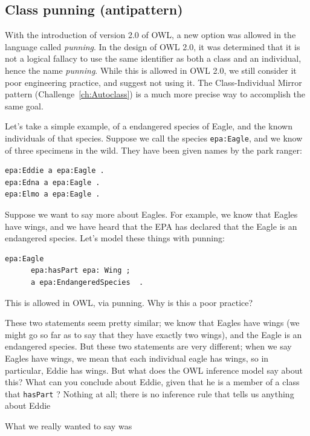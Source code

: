 \subsection{Class punning (antipattern)}

With the introduction of version 2.0 of OWL, a new option was allowed in the 
language called \emph{punning}.  In the design of OWL 2.0, it was determined that 
it is not a logical fallacy to use the same identifier as both a class and 
an individual, hence the name \emph{punning}.  While this is allowed in OWL 2.0, 
we still consider it poor engineering practice, and suggest not using it.  The
Class-Individual Mirror pattern (Challenge~\ref{ch:Autoclass}) is a much more precise way
to accomplish the same goal. 

Let's take a simple example, of a endangered species of Eagle, and the known 
individuals of that species.  Suppose we call the species \texttt{epa:Eagle}, and 
we know of three specimens in the wild.  They have been given names by the 
park ranger:

\begin{lstlisting}
epa:Eddie a epa:Eagle .
epa:Edna a epa:Eagle .
epa:Elmo a epa:Eagle . 
\end{lstlisting}

Suppose we want to say more about Eagles.  For example, we know that Eagles have 
wings, and we have heard that the EPA has declared that the Eagle is an endangered species.
Let's model these things with punning:

\begin{lstlisting}
epa:Eagle 
      epa:hasPart epa: Wing ;
      a epa:EndangeredSpecies  .
\end{lstlisting}

This is allowed in OWL, via punning.  Why is this a poor practice? 

These two statements seem pretty similar; we know that Eagles have wings 
(we might go so far as to say that they have exactly two wings), and
the Eagle is an endangered species. But these
two statements are very different; when we say Eagles have wings, we mean that 
each individual eagle has wings, so in particular, Eddie has wings.  But 
what does the OWL inference model say about this?  What can you conclude about Eddie,
given that he is a member of a class that \texttt{hasPart} ? 
Nothing at all; there is no inference rule that 
tells us anything about Eddie

What we really
wanted to say was 

